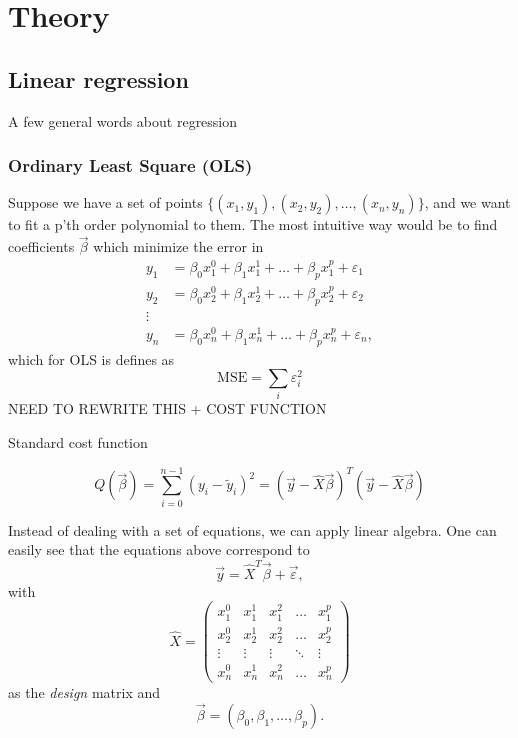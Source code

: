 \section{Theory} \label{sec:theory}

\subsection{Linear regression} \label{sec:regression}
A few general words about regression

\subsubsection{Ordinary Least Square (OLS)} \label{sec:OLS}
Suppose we have a set of points $\{(x_1, y_1), (x_2, y_2),\hdots, (x_n, y_n)\}$, and we want to fit a p'th order polynomial to them. The most intuitive way would be to find coefficients $\vec{\beta}$ which minimize the error in
\begin{align*}
y_1&=\beta_0x_1^0+\beta_1x_1^1+\hdots+\beta_px_1^p+\varepsilon_1\\
y_2&=\beta_0x_2^0+\beta_1x_2^1+\hdots+\beta_px_2^p+\varepsilon_2\\
\vdots\\
y_n&=\beta_0x_n^0+\beta_1x_n^1+\hdots+\beta_px_n^p+\varepsilon_n,
\end{align*}
which for OLS is defines as
\begin{equation}
\text{MSE}=\sum_i\varepsilon_i^2
\end{equation}
NEED TO REWRITE THIS + COST FUNCTION

Standard cost function

\begin{equation}
Q(\vec{\beta})=\sum_{i=0}^{n-1}(y_i-\tilde{y}_i)^2=(\vec{y}-\hat{X}\vec{\beta})^T(\vec{y}-\hat{X}\vec{\beta})
\end{equation}

Instead of dealing with a set of equations, we can apply linear algebra. One can easily see that the equations above correspond to
\begin{equation}
\vec{y}=\hat{X}^T\vec{\beta}+\vec{\varepsilon},
\label{eq:y_xb}
\end{equation}
with
\begin{equation}
\hat{X}=\begin{pmatrix}
x_1^0&x_1^1&x_1^2&\hdots&x_1^p\\
x_2^0&x_2^1&x_2^2&\hdots&x_2^p\\
\vdots&\vdots&\vdots&\ddots&\vdots\\
x_n^0&x_n^1&x_n^2&\hdots&x_n^p
\end{pmatrix}
\end{equation}
as the \textit{design} matrix and
\begin{equation}
\vec{\beta}=(\beta_0, \beta_1, \hdots, \beta_p).
\end{equation}

